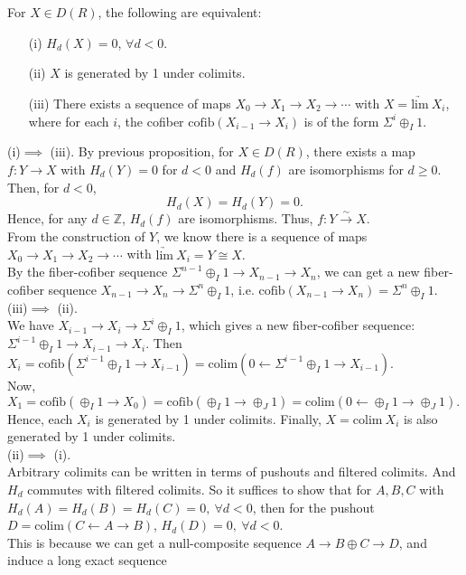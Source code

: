 \documentclass[UTF8,12,a4paper]{ctexart}
\theoremstyle{definition}
\begin{document}
\prop 
For $X\in D(R)$, the following are equivalent:
\begin{itemize}
	\item [(i)] $H_d(X)=0$, $\forall d<0.$
	\item [(ii)] $X$ is generated by 1 under colimits.
	\item [(iii)] There exists a sequence of maps $X_0\rightarrow X_1\rightarrow X_2\rightarrow\cdots$ with $X=\underrightarrow{\text{lim}}\ X_i$, where for each $i$, the cofiber $\text{cofib}(X_{i-1}\rightarrow X_i)$ is of the form $\Sigma^i \oplus_I 1.$
\end{itemize}
\pf
(i)$\implies$ (iii). By previous proposition, for $X\in D(R)$, there exists a map $f:Y\rightarrow X$ with $H_d(Y)=0$ for $d<0$ and $H_d(f)$ are isomorphisms for $d\geq 0.$ Then, for $d<0$,
$$H_d(X)=H_d(Y)=0.$$
Hence, for any $d\in\mathbb{Z}$, $H_d(f)$ are isomorphisms. Thus, $f:Y\stackrel{\sim}{\rightarrow} X$.
\\From the construction of $Y$, we know there is a sequence of maps $X_0\rightarrow X_1\rightarrow X_2\rightarrow\cdots$ with $\underrightarrow{\text{lim}}\ X_i=Y\cong X.$ \\
By the fiber-cofiber sequence 
$\Sigma^{n-1}\oplus_I 1\to X_{n-1}\to X_n$, we can get a new fiber-cofiber sequence $  X_{n-1}\to X_n\to \Sigma^{n}\oplus_I 1$, i.e. $\text{cofib}(X_{n-1}\to X_n)=\Sigma^{n}\oplus_I 1$.\\
(iii)$\implies$ (ii).\\
We have $X_{i-1}\rightarrow X_i\rightarrow \Sigma^i \oplus_I 1$, which gives a new fiber-cofiber sequence: $\Sigma^{i-1} \oplus_I 1\rightarrow X_{i-1}\rightarrow X_i$. Then $X_i=\text{cofib}(\Sigma^{i-1} \oplus_I 1\rightarrow X_{i-1})=\text{colim}(0\leftarrow \Sigma^{i-1} \oplus_I 1\rightarrow X_{i-1}).$\\
Now, $X_1=\text{cofib}(\oplus_I 1\rightarrow X_0)=\text{cofib}(\oplus_I 1\rightarrow \oplus_J 1)=\text{colim}(0\leftarrow \oplus_I 1\rightarrow \oplus_J 1).$ Hence, each $X_i$ is generated by 1 under colimits. Finally, $X=\text{colim}\ X_i$ is also generated by 1 under colimits.\\
(ii)$\implies$ (i).\\
Arbitrary colimits can be written in terms of pushouts and filtered colimits. And $H_d$ commutes with filtered colimits. So it suffices to show that for $A, B, C$ with $H_d(A)=H_d(B)=H_d(C)=0,\ \forall d<0$, then for the pushout $D=\text{colim}(C\leftarrow A\rightarrow B)$, $H_d(D)=0,\ \forall d<0.$\\
This is because we can get a null-composite sequence $A\to B\oplus C\to D$, and induce a long exact sequence
\end{document}
